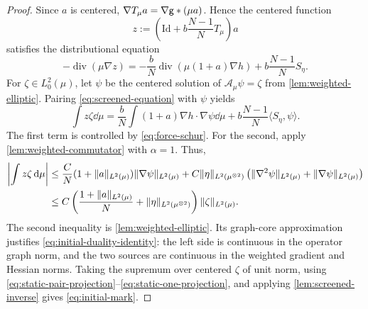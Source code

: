\documentclass[11pt,reqno]{amsart}
\numberwithin{equation}{section}
\theoremstyle{plain}
\theoremstyle{remark}
\DeclarePairedDelimiter{\norm}{\lVert}{\rVert}
\DeclareMathOperator{\diver}{div}
\newcommand{\Aop}{\mathcal A}
\newcommand{\Id}{\mathrm{Id}}
\begin{document}
\begin{proof}
Since $a$ is centered, $\nabla T_\mu a=\nabla\mathsf g*(\mu a)$. Hence the centered function
\begin{equation}\label{eq:initial-screened-variable}
 z:=\left(\Id+b\frac{N-1}{N}T_\mu\right)a
\end{equation}
satisfies the distributional equation
\begin{equation}\label{eq:screened-equation}
 -\diver(\mu\nabla z)=-\frac bN\diver(\mu(1+a)\nabla h)
                      +b\frac{N-1}{N}S_\eta.
\end{equation}
For $\zeta\in L^2_0(\mu)$, let $\psi$ be the centered solution of $\Aop_\mu\psi=\zeta$ from \cref{lem:weighted-elliptic}. Pairing \eqref{eq:screened-equation} with $\psi$ yields
\begin{equation}\label{eq:initial-duality-identity}
 \int z\zeta\dd\mu
 =\frac bN\int(1+a)\nabla h\cdot\nabla\psi\dd\mu
       +b\frac{N-1}{N}\langle S_\eta,\psi\rangle.
\end{equation}
The first term is controlled by \eqref{eq:force-schur}. For the second, apply \cref{lem:weighted-commutator} with $\alpha=1$. Thus,
\begin{align}
 \left|\int z\zeta\dd\mu\right|
 &\le \frac C N(1+\norm a_{L^2(\mu)})\norm{\nabla\psi}_{L^2(\mu)}
 +C\norm\eta_{L^2(\mu^{\otimes2})}
       \left(\norm{\nabla^2\psi}_{L^2(\mu)}+\norm{\nabla\psi}_{L^2(\mu)}\right)
 \notag\\
 &\le C\left(\frac{1+\norm a_{L^2(\mu)}}N
                      +\norm\eta_{L^2(\mu^{\otimes2})}\right)
                         \norm\zeta_{L^2(\mu)}.\label{eq:initial-duality}
\end{align}
The second inequality is \cref{lem:weighted-elliptic}. Its graph-core approximation justifies \eqref{eq:initial-duality-identity}: the left side is continuous in the operator graph norm, and the two sources are continuous in the weighted gradient and Hessian norms. Taking the supremum over centered $\zeta$ of unit norm, using \eqref{eq:static-pair-projection}--\eqref{eq:static-one-projection}, and applying \cref{lem:screened-inverse} gives \eqref{eq:initial-mark}.
\end{proof}
\end{document}

